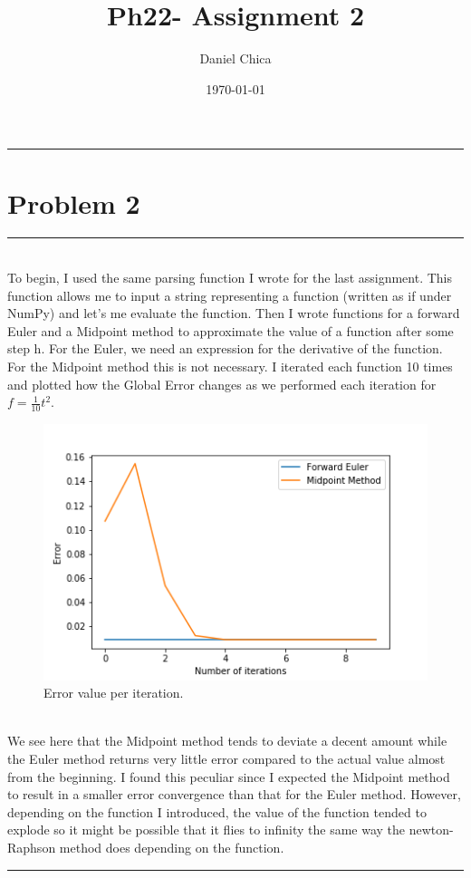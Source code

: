 \documentclass[11pt]{article}
\begin{document}
	\title{Ph22- Assignment 2}
	\author{Daniel Chica}
	\date{\today}
	\maketitle

\noindent\rule{6.5in}{0.5pt}
\section*{\huge Problem 2}
\rule{6.5in}{2pt}\\
To begin, I used the same parsing function I wrote for the last assignment. This function allows me to input a string representing a function (written as if under NumPy) and let's me evaluate the function. Then I wrote functions for a forward Euler and a Midpoint method to approximate the value of a function after some step h. For the Euler, we need an expression for the derivative of the function. For the Midpoint method this is not necessary. I iterated each function 10 times and plotted how the Global Error changes as we performed each iteration for $f= \frac{1}{10} t^{2}$.

\begin{figure}[hb]
\begin{center}
\includegraphics[scale=.6]{Error1.png}
\end{center}
\caption{Error value per iteration.}
\end{figure}\\

\noindent We see here that the Midpoint method tends to deviate a decent amount while the Euler method returns very little error compared to the actual value almost from the beginning. I found this peculiar since I expected the Midpoint method to result in a smaller error convergence than that for the Euler method. However, depending on the function I introduced, the value of the function tended to explode so it might be possible that it flies to infinity the same way the newton-Raphson method does depending on the function.\\
\noindent\rule{6.5in}{0.5pt}
\pagebreak
\end{document}
